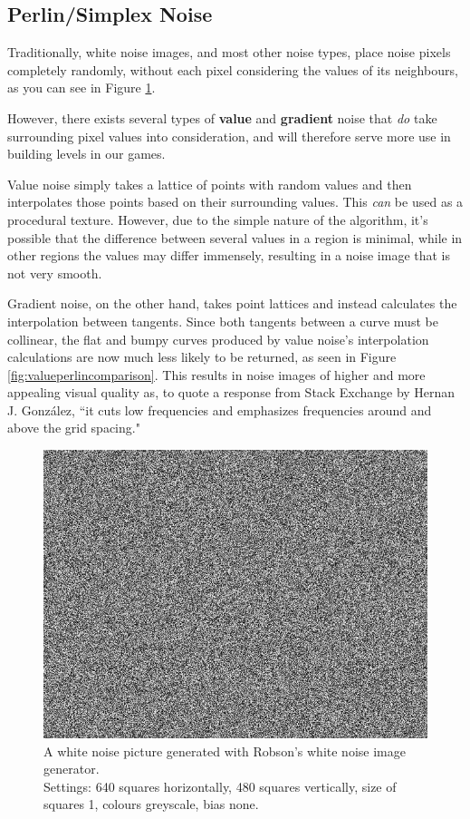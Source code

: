 \subsection{Perlin/Simplex Noise}

Traditionally, white noise images, and most other noise types, place noise pixels completely randomly, without each pixel considering the values of its neighbours\cite{gd3perlinnoise}, as you can see in Figure \ref{fig:whitenoisepic}.

However, there exists several types of \textbf{value} and \textbf{gradient} noise that \textit{do} take surrounding pixel values into consideration, and will therefore serve more use in building levels in our games.

Value noise simply takes a lattice of points with random values and then interpolates those points based on their surrounding values. This \textit{can} be used as a procedural texture. However, due to the simple nature of the algorithm, it's possible that the difference between several values in a region is minimal, while in other regions the values may differ immensely, resulting in a noise image that is not very smooth.

Gradient noise, on the other hand, takes point lattices and instead calculates the interpolation between tangents.\cite{perlinvalue} Since both tangents between a curve must be collinear\cite{perlinvalue}, the flat and bumpy curves produced by value noise's interpolation calculations are now much less likely to be returned, as seen in Figure \ref{fig:valueperlincomparison}.\cite{perlinvalue} This results in noise images of higher and more appealing visual quality as, to quote a response from Stack Exchange by Hernan J. González\cite{gradientvalue}, ``it cuts low frequencies and emphasizes frequencies around and above the grid spacing."

\begin{figure}[H]
    \centering
    \includegraphics[width=\textwidth]{Images/whitenoisepic.png}
    \caption{A white noise picture generated with Robson's white noise image generator.\cite{whitenoisepicgen}\\Settings: 640 squares horizontally, 480 squares vertically, size of squares 1, colours greyscale, bias none.}
    \label{fig:whitenoisepic}
\end{figure}

